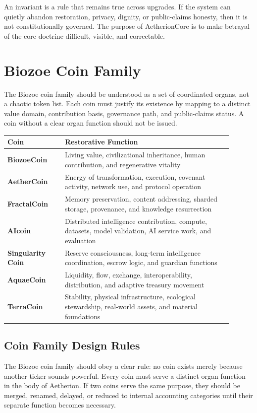 \documentclass[12pt]{article}
\begin{document}
An invariant is a rule that remains true across upgrades. If the system can quietly abandon restoration, privacy, dignity, or public-claims honesty, then it is not constitutionally governed. The purpose of AetherionCore is to make betrayal of the core doctrine difficult, visible, and correctable.

\section{Biozoe Coin Family}

The Biozoe coin family should be understood as a set of coordinated organs, not a chaotic token list. Each coin must justify its existence by mapping to a distinct value domain, contribution basis, governance path, and public-claims status. A coin without a clear organ function should not be issued.

\begin{longtable}{>{\bfseries}p{0.23\linewidth}p{0.67\linewidth}}
\toprule
Coin & Restorative Function \\
\midrule
BiozoeCoin & Living value, civilizational inheritance, human contribution, and regenerative vitality \\
AetherCoin & Energy of transformation, execution, covenant activity, network use, and protocol operation \\
FractalCoin & Memory preservation, content addressing, sharded storage, provenance, and knowledge resurrection \\
AIcoin & Distributed intelligence contribution, compute, datasets, model validation, AI service work, and evaluation \\
Singularity Coin & Reserve consciousness, long-term intelligence coordination, escrow logic, and guardian functions \\
AquaeCoin & Liquidity, flow, exchange, interoperability, distribution, and adaptive treasury movement \\
TerraCoin & Stability, physical infrastructure, ecological stewardship, real-world assets, and material foundations \\
\bottomrule
\end{longtable}

\subsection{Coin Family Design Rules}

The Biozoe coin family should obey a clear rule: no coin exists merely because another ticker sounds powerful. Every coin must serve a distinct organ function in the body of Aetherion. If two coins serve the same purpose, they should be merged, renamed, delayed, or reduced to internal accounting categories until their separate function becomes necessary.
\end{document}
